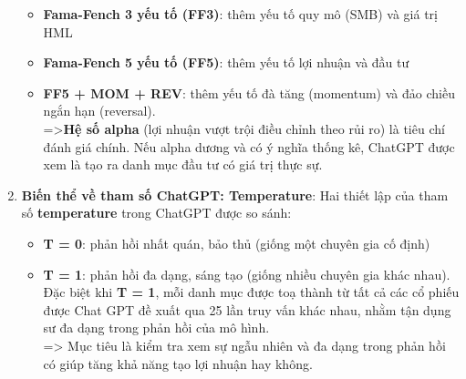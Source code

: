 \documentclass[a4paper,12pt]{article}
\begin{document}
\begin{enumerate}
\begin{itemize}
        \item  \textbf{Fama-Fench 3 yếu tố (FF3)}: thêm yếu tố quy mô (SMB) và giá trị HML
        \item \textbf{Fama-Fench 5 yếu tố (FF5)}: thêm yếu tố lợi nhuận và đầu tư
        \item \textbf{FF5 + MOM + REV}: thêm yếu tố đà tăng (momentum) và đảo chiều ngắn hạn (reversal).
        \\=>\textbf{Hệ số alpha} (lợi nhuận vượt trội điều chỉnh theo rủi ro) là tiêu chí đánh giá chính. Nếu alpha dương và có ý nghĩa thống kê, ChatGPT được xem là tạo ra danh mục đầu tư có giá trị thực sự.
    \end{itemize}
    \item \textbf{Biến thể về tham số ChatGPT: Temperature}: Hai thiết lập của tham số \textbf{temperature} trong ChatGPT được so sánh: \begin{itemize}
        \item \textbf{T = 0}: phản hồi nhất quán, bảo thủ (giống một chuyên gia cố định)
        \item \textbf{T = 1}: phản hồi đa dạng, sáng tạo (giống nhiều chuyên gia khác nhau). Đặc biệt khi \textbf{T = 1}, mỗi danh mục được toạ thành từ tất cả các cổ phiếu được Chat GPT đề xuất qua 25 lần truy vấn khác nhau, nhằm tận dụng sư đa dạng trong phản hồi của mô hình.
        \\=> Mục tiêu là kiểm tra xem sự ngẫu nhiên và đa dạng trong phản hồi có giúp tăng khả năng tạo lợi nhuận hay không.
    \end{itemize}

\end{enumerate}
\end{document}
